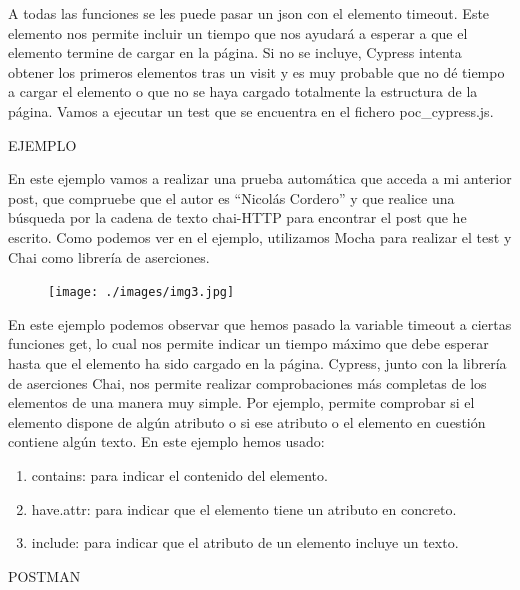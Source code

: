 \documentclass[letterpaper, 12pt, spanish]{article}
\begin{document}
A todas las funciones se les puede pasar un json con el elemento timeout. Este elemento nos permite incluir un tiempo que nos ayudará a esperar a que el elemento termine de cargar en la página.
Si no se incluye, Cypress intenta obtener los primeros elementos tras un visit y es muy probable que no dé tiempo a cargar el elemento o que no se haya cargado totalmente la estructura de la página.
Vamos a ejecutar un test que se encuentra en el fichero poc_cypress.js.

EJEMPLO

En este ejemplo vamos a realizar una prueba automática que acceda a mi anterior post, que compruebe que el autor es “Nicolás Cordero” y que realice una búsqueda por la cadena de texto chai-HTTP para encontrar el post que he escrito.
Como podemos ver en el ejemplo, utilizamos Mocha para realizar el test y Chai como librería de aserciones.

\begin{figure}[H]
	\begin{center}
		\texttt{[image: ./images/img3.jpg]}
		\caption{}
	\end{center}
\end{figure}
En este ejemplo podemos observar que hemos pasado la variable timeout a ciertas funciones get, lo cual nos permite indicar un tiempo máximo que debe esperar hasta que el elemento ha sido cargado en la página.
Cypress, junto con la librería de aserciones Chai, nos permite realizar comprobaciones más completas de los elementos de una manera muy simple.
Por ejemplo, permite comprobar si el elemento dispone de algún atributo o si ese atributo o el elemento en cuestión contiene algún texto. En este ejemplo hemos usado:

\begin{enumerate} %
	\item \textbf{}contains: para indicar el contenido del elemento.
	\item \textbf{}have.attr: para indicar que el elemento tiene un atributo en concreto.
	\item \textbf{}include: para indicar que el atributo de un elemento incluye un texto.
		
\end{enumerate}

POSTMAN
\end{document}
